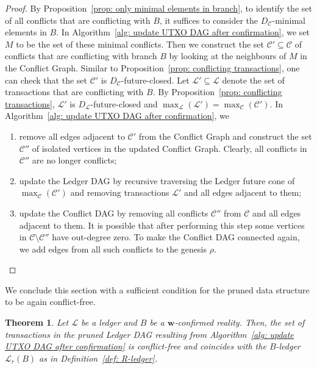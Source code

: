 \documentclass[11pt]{article}
\newcommand{\orig}{\rho}
\newcommand{\AW}{\mathbf{w}}
\newcommand{\conflictset}{\mathcal{C}}
\newcommand{\ledger}{\mathcal{L}}
\newcommand{\LedgerDAG}{D_{\ledger}}
\newcommand{\ConflictDAG}{D_{\conflictset}}
\theoremstyle{plain}
\newtheorem{theorem}{Theorem}
\theoremstyle{definition}
\numberwithin{definition}{section}
\numberwithin{lemma}{section}
\numberwithin{ass}{section}
\numberwithin{remark}{section}
\numberwithin{example}{section}
\numberwithin{proposition}{section}
\numberwithin{theorem}{section}
\begin{document}
\begin{proof}
By Proposition~\ref{prop: only minimal elements in branch}, to identify the set of all conflicts that are conflicting with ${B}$, it suffices to consider the $\ConflictDAG$-minimal elements in ${B}$. In Algorithm~\ref{alg: update UTXO DAG after confirmation}, we set $M$ to be the set of these minimal conflicts. Then we construct the set $\conflictset'\subseteq \conflictset$ of conflicts that are conflicting with branch ${B}$ by looking at the neighbours of $M$ in the Conflict Graph. Similar to Proposition~\ref{prop: conflicting transactions}, one can check that the set $\conflictset'$ is $\ConflictDAG$-future-closed.  Let $\ledger'\subseteq \ledger$ denote the set of transactions that are conflicting with ${B}$. By Proposition~\ref{prop: conflicting transactions}, $\ledger'$ is $\LedgerDAG$-future-closed and $\max_{\ledger}(\ledger')=\max_{\conflictset}(\conflictset')$. In Algorithm~\ref{alg: update UTXO DAG after confirmation}, we 
\begin{enumerate}[leftmargin=*]
     \item remove all edges adjacent to $\conflictset '$ from the Conflict Graph and construct the set  $\conflictset''$ of isolated vertices in the updated Conflict Graph. Clearly, all conflicts in $\conflictset''$ are no longer conflicts;
    \item update the Ledger DAG by recursive traversing the Ledger future cone  of $\max_{\conflictset}(\conflictset')$ and removing transactions $\ledger'$ and all edges adjacent to them;
    \item update the Conflict DAG by removing all conflicts  $\conflictset''$ from $\conflictset$ and all edges adjacent to them. It is possible that after performing this step some vertices in $\conflictset\setminus \conflictset''$ have out-degree zero. To make the Conflict DAG connected again, we add edges from all such conflicts to the genesis $\orig$.
\end{enumerate}



\end{proof}
We conclude this section with a sufficient condition for the pruned data structure to be again conflict-free.
\begin{theorem}
Let $\ledger$ be a ledger and ${B}$ be a  $\AW$-confirmed reality. Then, the set of transactions in the pruned Ledger DAG resulting from Algorithm~\ref{alg: update UTXO DAG after confirmation} is conflict-free and coincides with the $B$-ledger $\ledger_r(B)$ as in Definition~\ref{def: R-ledger}.
\end{theorem}
\end{document}
